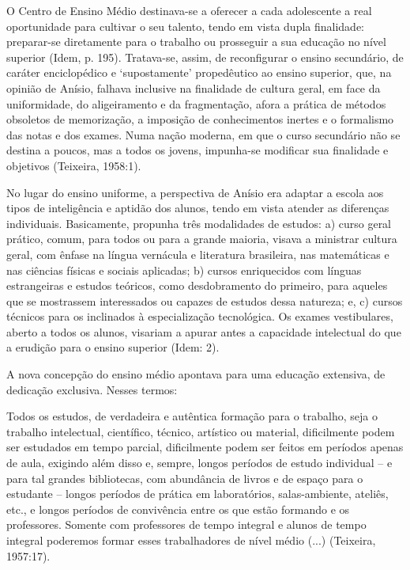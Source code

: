 O Centro de Ensino Médio destinava-se a oferecer a cada adolescente a real
oportunidade para cultivar o seu talento, tendo em vista dupla finalidade: preparar-se
diretamente para o trabalho ou prosseguir a sua educação no nível superior (Idem, p.
195). Tratava-se, assim, de reconfigurar o ensino secundário, de caráter enciclopédico e
‘supostamente’ propedêutico ao ensino superior, que, na opinião de Anísio, falhava
inclusive na finalidade de cultura geral, em face da uniformidade, do aligeiramento e da
fragmentação, afora a prática de métodos obsoletos de memorização, a imposição de
conhecimentos inertes e o formalismo das notas e dos exames. Numa nação moderna,
em que o curso secundário não se destina a poucos, mas a todos os jovens, impunha-se
modificar sua finalidade e objetivos (Teixeira, 1958:1).

No lugar do ensino uniforme, a perspectiva de Anísio era adaptar a escola aos
tipos de inteligência e aptidão dos alunos, tendo em vista atender as diferenças
individuais. Basicamente, propunha três modalidades de estudos: a) curso geral prático,
comum, para todos ou para a grande maioria, visava a ministrar cultura geral, com
ênfase na língua vernácula e literatura brasileira, nas matemáticas e nas ciências físicas
e sociais aplicadas; b) cursos enriquecidos com línguas estrangeiras e estudos teóricos,
como desdobramento do primeiro, para aqueles que se mostrassem interessados ou
capazes de estudos dessa natureza; e, c) cursos técnicos para os inclinados à
especialização tecnológica. Os exames vestibulares, aberto a todos os alunos, visariam a
apurar antes a capacidade intelectual do que a erudição para o ensino superior (Idem: 2).

A nova concepção do ensino médio apontava para uma educação extensiva, de
dedicação exclusiva. Nesses termos:

\begin{citacao}
    Todos os estudos, de verdadeira e autêntica formação para o trabalho, seja o
    trabalho intelectual, científico, técnico, artístico ou material, dificilmente
    podem ser estudados em tempo parcial, dificilmente podem ser feitos em
    períodos apenas de aula, exigindo além disso e, sempre, longos períodos de
    estudo individual – e para tal grandes bibliotecas, com abundância de livros
    e de espaço para o estudante – longos períodos de prática em laboratórios,
    salas-ambiente, ateliês, etc., e longos períodos de convivência entre os que
    estão formando e os professores. Somente com professores de tempo
    integral e alunos de tempo integral poderemos formar esses trabalhadores de
    nível médio (...) (Teixeira, 1957:17).
\end{citacao}

